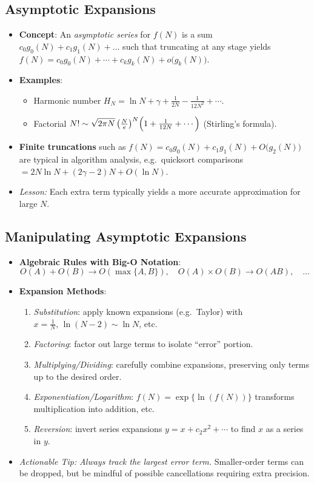 \documentclass[11pt,letterpaper]{article}
\begin{document}
\subsection{Asymptotic Expansions}
\begin{itemize}
  \item \textbf{Concept}: An \emph{asymptotic series} for $f(N)$ is a sum $c_0g_0(N)+c_1g_1(N)+\dots$ such that truncating at any stage yields $f(N)= c_0g_0(N)+\cdots+c_k g_k(N) + o\bigl(g_k(N)\bigr).$
  \item \textbf{Examples}:
    \begin{itemize}
      \item Harmonic number $H_N = \ln N + \gamma + \frac{1}{2N} - \frac{1}{12N^2} + \cdots$.
      \item Factorial $\displaystyle N! \sim \sqrt{2\pi N}\,\bigl(\tfrac{N}{e}\bigr)^N\Bigl(1+\tfrac{1}{12N}+\cdots\Bigr)$ (Stirling's formula).
    \end{itemize}
  \item \textbf{Finite truncations} such as $f(N)=c_0g_0(N)+c_1g_1(N)+O\bigl(g_2(N)\bigr)$ are typical in algorithm analysis, e.g.\ quicksort comparisons $= 2N\ln N + (2\gamma-2)N + O(\ln N)$.
  \item \emph{Lesson:} Each extra term typically yields a more accurate approximation for large $N$. 
\end{itemize}

\subsection{Manipulating Asymptotic Expansions}
\begin{itemize}
  \item \textbf{Algebraic Rules with Big-O Notation}:
    \[
      O(A)+O(B)\to O(\max\{A,B\}),\quad O(A)\times O(B)\to O(AB),
      \quad \dots
    \]
  \item \textbf{Expansion Methods}:
    \begin{enumerate}
      \item \emph{Substitution}: apply known expansions (e.g.\ Taylor) with $x=\frac{1}{N},\,\ln(N-2)\sim\ln N$, etc.
      \item \emph{Factoring}: factor out large terms to isolate “error” portion.
      \item \emph{Multiplying/Dividing}: carefully combine expansions, preserving only terms up to the desired order.
      \item \emph{Exponentiation/Logarithm}: $f(N)=\exp\{\ln(f(N))\}$ transforms multiplication into addition, etc.
      \item \emph{Reversion}: invert series expansions $y=x+c_2x^2+\cdots$ to find $x$ as a series in $y$.
    \end{enumerate}
  \item \emph{Actionable Tip:} \emph{Always track the largest error term.} Smaller-order terms can be dropped, but be mindful of possible cancellations requiring extra precision.
\end{itemize}
\end{document}
